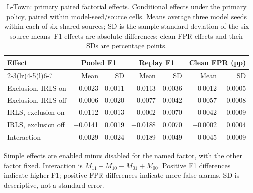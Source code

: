 \begin{table}[tbp]
\centering\small
\setlength{\tabcolsep}{4pt}
\renewcommand{\arraystretch}{1.1}
\caption[L-Town: primary paired factorial effects]{L-Town: primary paired factorial effects. Conditional effects under the primary policy, paired within model-seed/source cells. Means average three model seeds within each of six shared sources; SD is the sample standard deviation of the six source means. F1 effects are absolute differences; clean-FPR effects and their SDs are percentage points.}
\label{tab:factorial_effects_ltown}
\begin{tabular}{@{}lrrrrrr@{}}
\toprule
Effect & \multicolumn{2}{c}{Pooled F1} & \multicolumn{2}{c}{Replay F1} & \multicolumn{2}{c}{Clean FPR (pp)} \\
\cmidrule(lr){2-3}\cmidrule(lr){4-5}\cmidrule(l){6-7}
 & Mean & SD & Mean & SD & Mean & SD \\
\midrule
Exclusion, IRLS on & -0.0023 & 0.0011 & -0.0113 & 0.0036 & +0.0012 & 0.0005 \\
Exclusion, IRLS off & +0.0006 & 0.0020 & +0.0077 & 0.0042 & +0.0057 & 0.0008 \\
IRLS, exclusion on & +0.0112 & 0.0013 & -0.0002 & 0.0070 & -0.0042 & 0.0009 \\
IRLS, exclusion off & +0.0141 & 0.0019 & +0.0188 & 0.0070 & +0.0002 & 0.0004 \\
Interaction & -0.0029 & 0.0024 & -0.0189 & 0.0049 & -0.0045 & 0.0009 \\
\bottomrule
\end{tabular}
\par\smallskip
\begin{minipage}{\linewidth}\footnotesize Simple effects are enabled minus disabled for the named factor, with the other factor fixed. Interaction is $M_{11}-M_{10}-M_{01}+M_{00}$. Positive F1 differences indicate higher F1; positive FPR differences indicate more false alarms. SD is descriptive, not a standard error.\end{minipage}
\end{table}
